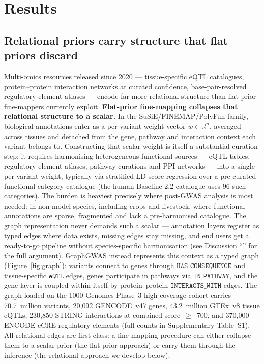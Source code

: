 \section*{Results}

\subsection*{Relational priors carry structure that flat priors discard}

Multi-omics resources released since 2020 --- tissue-specific eQTL
catalogues, protein--protein interaction networks at curated
confidence, base-pair-resolved regulatory-element atlases ---
encode far more relational structure than flat-prior fine-mappers
currently exploit. \textbf{Flat-prior fine-mapping collapses that
relational structure to a scalar.} In the SuSiE/FINEMAP/PolyFun family, biological annotations
enter as a per-variant weight vector $w \in \mathbb{R}^n$, averaged
across tissues and detached from the gene, pathway and interaction
context each variant belongs to. Constructing that scalar weight is
itself a substantial curation step: it requires harmonising
heterogeneous functional sources --- eQTL tables, regulatory-element
atlases, pathway curations and PPI networks --- into a single
per-variant weight, typically via stratified LD-score regression over
a pre-curated functional-category catalogue (the human Baseline 2.2
catalogue uses 96 such categories\cite{finucane2015partitioning}).
The burden is heaviest precisely where post-GWAS analysis is most
needed: in non-model species, including crops and livestock, where functional
annotations are sparse, fragmented and lack a pre-harmonised
catalogue. The graph representation never demands such a scalar ---
annotation layers register as typed edges where data exists, missing
edges stay missing, and end users get a ready-to-go pipeline without
species-specific harmonisation (see Discussion
``'' for the full argument). GraphGWAS instead represents this
context as a typed graph (Figure~\ref{fig:graph}): variants connect
to genes through $\texttt{HAS\_CONSEQUENCE}$ and tissue-specific
$\texttt{eQTL}$ edges, genes participate in pathways via
$\texttt{IN\_PATHWAY}$, and the gene layer is coupled within itself
by protein--protein $\texttt{INTERACTS\_WITH}$ edges. The graph loaded on the 1000 Genomes Phase~3 high-coverage cohort
\cite{1000genomes2015global,byrska2022high} carries 70.7~million
variants, 20{,}092 GENCODE~v47 genes\cite{frankish2023gencode},
43.2~million GTEx~v8 tissue eQTLs\cite{gtex2020}, 230{,}850 STRING
interactions at combined score~$\geq$~700\cite{szklarczyk2023string},
and 370{,}000 ENCODE cCRE regulatory elements\cite{encode2020expanded}
(full counts in Supplementary Table~S1). All
relational edges are first-class: a fine-mapping procedure can either
collapse them to a scalar prior (the flat-prior approach) or carry
them through the inference (the relational approach we develop
below).

